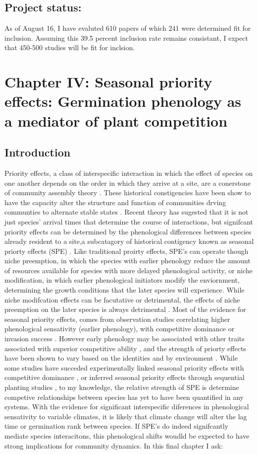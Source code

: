\documentclass{article}\usepackage[]{graphicx}\usepackage[]{color}
\begin{document}
\subsection*{Project status:}
As of August 16, I have evaluted 610 papers of which 241 were determined fit for inclusion. Assuming this 39.5 percent inclusion rate remains consistant, I expect that 450-500 studies will be fit for inclsion.
\section*{Chapter IV: Seasonal priority effects: Germination phenology as a mediator of plant competition}
\subsection*{Introduction}
\indent Priority effects, a class of interspecific interaction in which the effect of species on one another depends on the order in which they arrive at a site, are a conerstone of community assembly theory \citep{Fukami2015}. These historical constigencies have been show to have the capacity alter the structure and function of communities drving communties to alternate stable states \citep{Fukami2011}. Recent theory has sugested that it is not just species' arrival times that determine the course of interactions, but signifcant priority effects can be determined by the phenological differences between species already resident to a site,a subcatagory of historical contigency known as seasonal priorty effects (SPE) \citep{Wainwright2012}. Like traditional proirty effects, SPE's can operate though niche preemption, in which the species with earlier phenology reduce the amount of resources available for species with more delayed phenological activity, or niche modification, in which earlier phenological initiators modify the enviornment, determining the growth conditions that the later species will experience. While niche modifcation effects can be facutative or detrimental, the effects of niche preemption on the later species is always detrimental \citep{Fukami2015}. Most of the evidence for seasonal priority effects, comes from observation studies correlating higher phenological sensativity (earlier phenology), with competitive dominance or invasion success \citep{Gioria2018}. However early phenology may be associated with other traits associated with superior competitive ability \citep{Dickson2012}, and the strength of priorty effects have been shown to vary based on the identities \citep{Cleland2015} and by environment \citep{Kardol2013}.  While some studies have succeded experimentally linked seasonal priority effects with competitive dominance \citep{Wainwright2012}, or inferred seasonal priority effects through sequential planting studies \citep{Korner2008}, to my knowledge, the relative strength of SPE is determine competive relationships between species has yet to have been quantified in any systems. With the evidence for significant interspecific diferences in phenological sensativity to variable climates, it is likely that climate change will alter the lag time or germination rank between species. If SPE's do indeed signifcantly mediate species interacitons, this phenological shifts woudld be expected to have strong implications for community dynamics. In this final chapter I ask:
\end{document}
